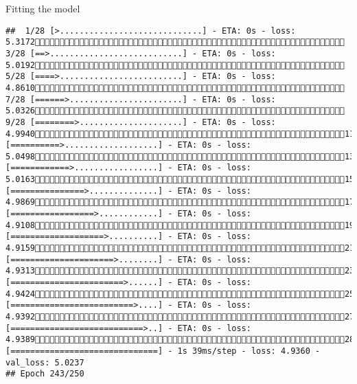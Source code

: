 \documentclass[
  ignorenonframetext,
]{beamer}
\begin{document}
\begin{frame}[fragile]{Fitting the model}
\begin{verbatim}
##  1/28 [>.............................] - ETA: 0s - loss: 5.3172 3/28 [==>...........................] - ETA: 0s - loss: 5.0192 5/28 [====>.........................] - ETA: 0s - loss: 4.8610 7/28 [======>.......................] - ETA: 0s - loss: 5.0326 9/28 [========>.....................] - ETA: 0s - loss: 4.994011/28 [==========>...................] - ETA: 0s - loss: 5.049813/28 [============>.................] - ETA: 0s - loss: 5.016315/28 [===============>..............] - ETA: 0s - loss: 4.986917/28 [=================>............] - ETA: 0s - loss: 4.910819/28 [===================>..........] - ETA: 0s - loss: 4.915921/28 [=====================>........] - ETA: 0s - loss: 4.931323/28 [=======================>......] - ETA: 0s - loss: 4.942425/28 [=========================>....] - ETA: 0s - loss: 4.939227/28 [===========================>..] - ETA: 0s - loss: 4.938928/28 [==============================] - 1s 39ms/step - loss: 4.9360 - val_loss: 5.0237
## Epoch 243/250

\end{verbatim}
\end{frame}
\end{document}
